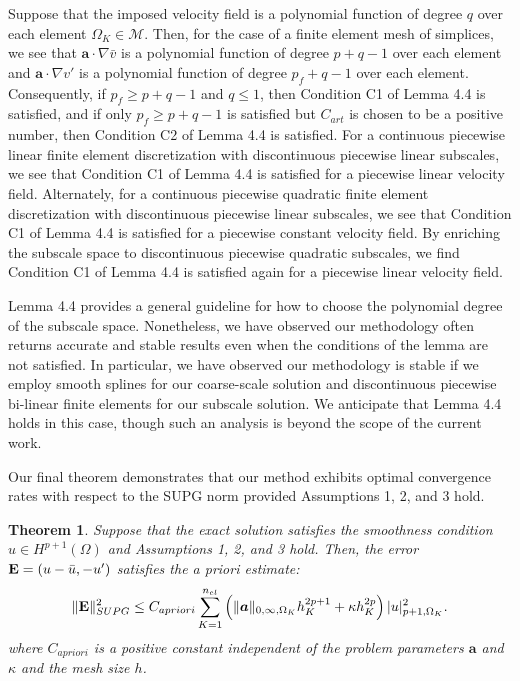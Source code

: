 \documentclass[11pt]{article}
\newtheorem{theorem}{Theorem}[section]
\begin{document}
Suppose that the imposed velocity field is a polynomial function of degree $q$ over each element $\Omega_K \in \mathcal{M}$.  Then, for the case of a finite element mesh of simplices, we see that $\bm{a} \cdot \nabla \bar{v}$ is a polynomial function of degree $p + q - 1$ over each element and $\bm{a} \cdot \nabla v'$ is a polynomial function of degree $p_f + q - 1$ over each element.  Consequently, if $p_f \geq p + q - 1$ and $q \leq 1$, then Condition C1 of Lemma 4.4 is satisfied, and if only $p_f \geq p + q - 1$ is satisfied but $C_{art}$ is chosen to be a positive number, then Condition C2 of Lemma 4.4 is satisfied.  For a continuous piecewise linear finite element discretization with discontinuous piecewise linear subscales, we see that Condition C1 of Lemma 4.4 is satisfied for a piecewise linear velocity field.  Alternately, for a continuous piecewise quadratic finite element discretization with discontinuous piecewise linear subscales, we see that Condition C1 of Lemma 4.4 is satisfied for a piecewise constant velocity field.  By enriching the subscale space to discontinuous piecewise quadratic subscales, we find Condition C1 of Lemma 4.4 is satisfied again for a piecewise linear velocity field.

Lemma 4.4 provides a general guideline for how to choose the polynomial degree of the subscale space.  Nonetheless, we have observed our methodology often returns accurate and stable results even when the conditions of the lemma are not satisfied.  In particular, we have observed our methodology is stable if we employ smooth splines for our coarse-scale solution and discontinuous piecewise bi-linear finite elements for our subscale solution.  We anticipate that Lemma 4.4 holds in this case, though such an analysis is beyond the scope of the current work.

Our final theorem demonstrates that our method exhibits optimal convergence rates with respect to the SUPG norm provided Assumptions 1, 2, and 3 hold.

\begin{theorem}
Suppose that the exact solution satisfies the smoothness condition $u \in H^{p+1}(\Omega)$ and Assumptions 1, 2, and 3 hold.  Then, the error $\textup{\textbf{E}} = (u-\bar{u},-u')$ satisfies the \textit{a priori} estimate:
\begin{equation}
\| \textup{\textbf{E}} \|^2_{SUPG} \leq C_{a priori} \sum_{K=1}^{n_{el}} \left( \| \bm{a} \|_{0,\infty,\Omega_K} h^{2p+1}_K + \kappa h^{2p}_K \right) | u |^2_{p+1,\Omega_K}. \nonumber
\end{equation}
where $C_{a priori}$ is a positive constant independent of the problem parameters $\bm{a}$ and $\kappa$ and the mesh size $h$.
\end{theorem}
\end{document}
